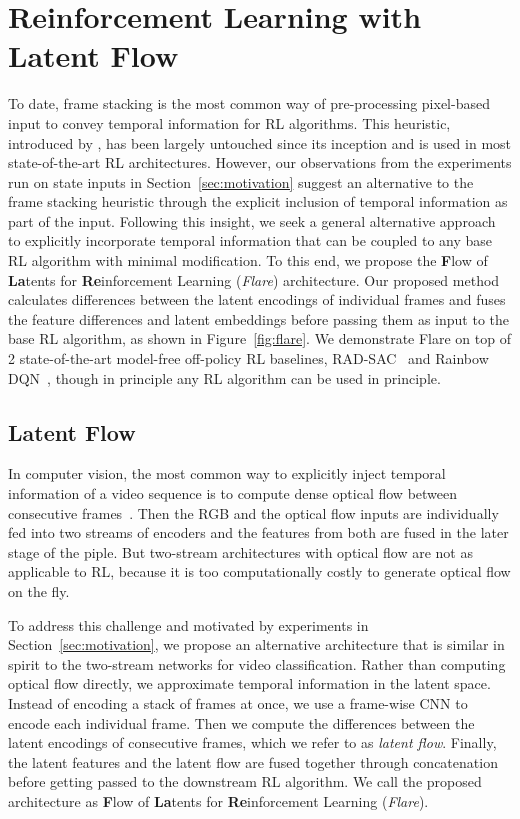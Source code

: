 \documentclass{article} \usepackage{iclr2021_conference,times}
\begin{document}
\section{Reinforcement Learning with Latent Flow}
To date, frame stacking is the most common way of pre-processing pixel-based input to convey temporal information for RL algorithms. This heuristic, introduced by \citet{mnih2015human}, has been largely untouched since its inception and is used in most state-of-the-art RL architectures. However, our observations from the experiments run on state inputs in Section~\ref{sec:motivation} suggest an alternative to the frame stacking heuristic through the explicit inclusion of temporal information as part of the input. Following this insight, we seek a general alternative approach to explicitly incorporate temporal information that can be coupled to any base RL algorithm with minimal modification. To this end, we propose the {\bf F}low of {\bf La}tents for {\bf Re}inforcement Learning (\emph{Flare}) architecture. Our proposed method calculates differences between the latent encodings of individual frames and fuses the feature differences and latent embeddings before passing them as input to the base RL algorithm, as shown in Figure~\ref{fig:flare}. We demonstrate Flare on top of 2 state-of-the-art model-free off-policy RL baselines, RAD-SAC~\citep{laskin_lee2020rad} and Rainbow DQN~\citep{hessel2017rainbow}, though in principle any RL algorithm can be used in principle.

\subsection{Latent Flow}\label{sec:lf}
In computer vision, the most common way to explicitly inject temporal information of a video sequence is to compute dense optical flow between consecutive frames~\citep{simonyan2014two}. Then the RGB and the optical flow inputs are individually fed into two streams of encoders and the features from both are fused in the later stage of the piple. But two-stream architectures with optical flow are not as applicable to RL, because it is too computationally costly to generate optical flow on the fly.

To address this challenge and motivated by experiments in Section~\ref{sec:motivation}, we propose an alternative architecture that is similar in spirit to the two-stream networks for video classification. Rather than computing optical flow directly, we approximate temporal information in the latent space. Instead of encoding a stack of frames at once, we use a frame-wise CNN to encode each individual frame. Then we compute the differences between the latent encodings of consecutive frames, which we refer to as \emph{latent flow}. Finally, the latent features and the latent flow are fused together through concatenation before getting passed to the downstream RL algorithm. We call the proposed architecture as {\bf F}low of {\bf La}tents for {\bf Re}inforcement Learning (\emph{Flare}). 
\end{document}
